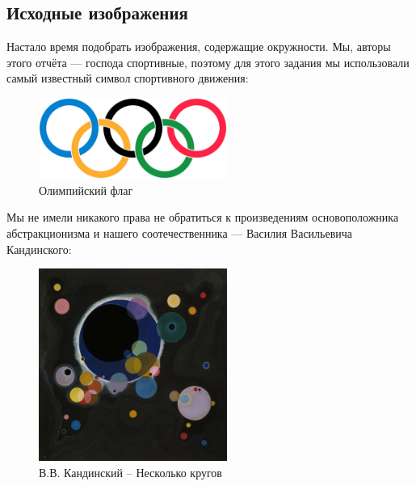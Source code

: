 \subsection{Исходные изображения}
Настало время подобрать изображения, содержащие окружности. Мы, авторы этого отчёта --- господа спортивные, поэтому для этого задания мы использовали самый известный символ спортивного движения:

\begin{figure}[ht!]
    \centering
    \includegraphics[width=0.55\textwidth]{images/circles/source/olympic.jpeg}
    \caption{Олимпийский флаг}
    \label{img:ol_logo}
\end{figure} 

Мы не имели никакого права не обратиться к произведениям основоположника абстракционизма и нашего соотечественника --- Василия Васильевича Кандинского:

\begin{figure}[ht!]
    \centering
    \includegraphics[width=0.55\textwidth]{images/circles/source/Kandinsky_Several_Circles.jpg}
    \caption{В.В. Кандинский -- Несколько кругов}
    \label{img:kan_logo}
\end{figure} 

\clearpage

